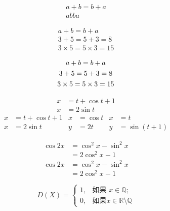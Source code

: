 \documentclass{ctexart}
\begin{document}
    \begin{gather}
        a+b=b+a\\
        ab  ba
    \end{gather}

    \begin{gather*}
        a+b=b+a\\
        3+5=5+3=8\\
        3\times 5=5\times 3=15
    \end{gather*}

    \begin{gather}
        a+b=b+a\\
        3+5=5+3=8 \notag \\
        3\times 5=5\times 3=15
    \end{gather}

    \begin{align}
        x &= t + \cos t + 1 \\
        x &= 2 \sin t
    \end{align}
    \begin{align*}
        x &= t + \cos t + 1  & x &= \cos t & x &= t\\
        x &= 2 \sin t & y &= 2t & y &= \sin(t+1)
    \end{align*}

    \begin{equation}
        \begin{split}
            \cos 2x &= \cos ^2 x-\sin^2 x\\
                    &= 2\cos^2x -1
        \end{split}
    \end{equation}
    \begin{equation*}
        \begin{split}
            \cos 2x &= \cos ^2 x-\sin^2 x\\
                    &= 2\cos^2x -1
        \end{split}
    \end{equation*}

    \begin{equation}
        D(X)=\begin{cases}
            1,& \text{如果 }x \in \mathbb{Q};\\
            0,& \text{如果}x \in \mathbb{R} \setminus\mathbb{Q}
        \end{cases}
    \end{equation}
\end{document}
